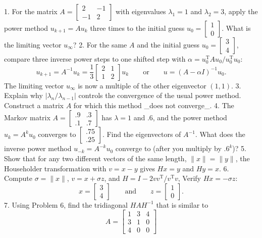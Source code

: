 1. For the matrix \(A=\left[\begin{smallmatrix}2&-1\\ -1&2\end{smallmatrix}\right]\) with eigenvalues \(\lambda_{1}=1\) and \(\lambda_{2}=3\), apply the power method \(u_{k+1}=Au_{k}\) three times to the initial guess \(u_{0}=\left[\begin{smallmatrix}1\\ 0\end{smallmatrix}\right]\). What is the limiting vector \(u_{\infty}\)?
2. For the same \(A\) and the initial guess \(u_{0}=\left[\begin{smallmatrix}3\\ 4\end{smallmatrix}\right]\), compare three inverse power steps to one shifted step with \(\alpha=u_{0}^{\mathrm{T}}Au_{0}/u_{0}^{\mathrm{T}}u_{0}\): \[u_{k+1}=A^{-1}u_{k}=\frac{1}{3}\begin{bmatrix}2&1\\ 1&2\end{bmatrix}u_{k}\qquad\text{or}\qquad u=(A-\alpha I)^{-1}u_{0}.\] The limiting vector \(u_{\infty}\) is now a multiple of the other eigenvector \((1,1)\).
3. Explain why \(|\lambda_{n}/\lambda_{n-1}|\) controls the convergence of the usual power method. Construct a matrix \(A\) for which this method _does not converge_.
4. The Markov matrix \(A=\left[\begin{smallmatrix}.9&.3\\ .1&.7\end{smallmatrix}\right]\) has \(\lambda=1\) and \(.6\), and the power method \(u_{k}=A^{k}u_{0}\) converges to \(\left[\begin{smallmatrix}.75\\ .25\end{smallmatrix}\right]\). Find the eigenvectors of \(A^{-1}\). What does the inverse power method \(u_{-k}=A^{-k}u_{0}\) converge to (after you multiply by \(.6^{k}\))?
5. Show that for any two different vectors of the same length, \(\|x\|=\|y\|\), the Householder transformation with \(v=x-y\) gives \(Hx=y\) and \(Hy=x\).
6. Compute \(\sigma=\|x\|\), \(v=x+\sigma z\), and \(H=I-2vv^{\mathrm{T}}/v^{\mathrm{T}}v\), Verify \(Hx=-\sigma z\): \[x=\begin{bmatrix}3\\ 4\end{bmatrix}\qquad\text{and}\qquad z=\begin{bmatrix}1\\ 0\end{bmatrix}.\]
7. Using Problem 6, find the tridiagonal \(HAH^{-1}\) that is similar to \[A=\begin{bmatrix}1&3&4\\ 3&1&0\\ 4&0&0\end{bmatrix}\] 